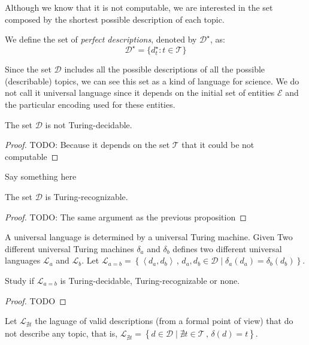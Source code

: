 Although we know that it is not computable, we are interested in the set composed by the shortest possible description of each topic.

\begin{definition}
We define the set of \emph{perfect descriptions}, denoted by $\mathcal{D}^\star$, as:
\[
\mathcal{D}^\star = \{ d_t^\star : t \in \mathcal{T} \}
\]
\end{definition}

Since the set $\mathcal{D}$ includes all the possible descriptions of all the possible (describable) topics, we can see this set as a kind of language for science. We do not call it universal language since it depends on the initial set of entities $\mathcal{E}$ and the particular encoding used for these entities.

\begin{proposition}
The set $\mathcal{D}$ is not Turing-decidable.
\end{proposition}
\begin{proof}
{\color{red} TODO: Because it depends on the set $\mathcal{T}$ that it could be not computable}
\end{proof}

Say something here

\begin{proposition}
The set $\mathcal{D}$ is Turing-recognizable.
\end{proposition}
\begin{proof}
{\color{red} TODO: The same argument as the previous proposition}
\end{proof}

A universal language is determined by a universal Turing machine. Given Two different universal Turing machines $\delta_{a}$ and $\delta_{b}$ defines two different universal languages $\mathcal{L}_{a}$ and $\mathcal{L}_{b}$. Let $\mathcal{L}_{a=b}=\left\{ \left\langle d_{a},d_{b}\right\rangle \,,\,d_{a},d_{b}\in\mathcal{D}\mid\delta_{a}\left(d_{a}\right)=\delta_{b}\left(d_{b}\right)\right\}$.

\begin{proposition}
Study if $\mathcal{L}_{a=b}$ is Turing-decidable, Turing-recognizable or none.
\end{proposition}
\begin{proof}
{\color{red} TODO}
\end{proof}

Let $\mathcal{L}_{\nexists t}$ the laguage of valid descriptions (from a formal point of view) that do not describe any topic, that is, $\mathcal{L}_{\nexists t}=\left\{ d\in\mathcal{D}\mid\nexists t\in\mathcal{T}\,,\,\delta\left(d\right)=t\right\}$.

